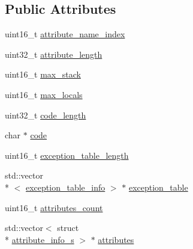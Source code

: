 \subsection*{Public Attributes}
\begin{DoxyCompactItemize}
\item 
uint16\+\_\+t \hyperlink{structCode__attribute__s_a2ad36c662b25c88553dffda3499b304a}{attribute\+\_\+name\+\_\+index}
\item 
uint32\+\_\+t \hyperlink{structCode__attribute__s_a83fe4677e5b3b8a9fb6460b064148ac3}{attribute\+\_\+length}
\item 
uint16\+\_\+t \hyperlink{structCode__attribute__s_a9f7cd4c713b350f6630949c6364e8e48}{max\+\_\+stack}
\item 
uint16\+\_\+t \hyperlink{structCode__attribute__s_a1c9257d634d9e8473acf1a3d13fac4e7}{max\+\_\+locals}
\item 
uint32\+\_\+t \hyperlink{structCode__attribute__s_ad5cdbcaf02efd1ac9d75d1d1d73d7523}{code\+\_\+length}
\item 
char $\ast$ \hyperlink{structCode__attribute__s_a6c555b4affb696853a72ee0df0af3864}{code}
\item 
uint16\+\_\+t \hyperlink{structCode__attribute__s_a73c51a112c0f08db03fe7622279b01e5}{exception\+\_\+table\+\_\+length}
\item 
std\+::vector\\*
$<$ \hyperlink{attributes_8hpp_a558a3f6c08900fb98e1ab97c492cc41b}{exception\+\_\+table\+\_\+info} $>$ $\ast$ \hyperlink{structCode__attribute__s_a64c20d58846e4b1af5c4de2a750e8fde}{exception\+\_\+table}
\item 
uint16\+\_\+t \hyperlink{structCode__attribute__s_a12d5860b06a8484744852c38cb79144e}{attributes\+\_\+count}
\item 
std\+::vector$<$ struct \\*
\hyperlink{structattribute__info__s}{attribute\+\_\+info\+\_\+s} $>$ $\ast$ \hyperlink{structCode__attribute__s_a04152c5c6f9f1067d6e144e1e3a814fe}{attributes}
\end{DoxyCompactItemize}


